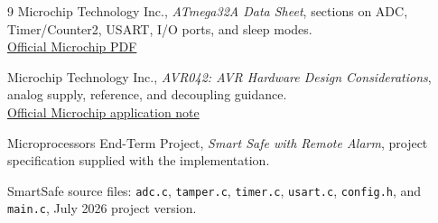 \documentclass[11pt,a4paper]{article}
\begin{document}
\begin{thebibliography}{9}
Microchip Technology Inc., \emph{ATmega32A Data Sheet}, sections on ADC, Timer/Counter2, USART, I/O ports, and sleep modes.\\
\href{https://ww1.microchip.com/downloads/en/DeviceDoc/Atmega32A-Data-Sheet-DS40002072A.pdf}{Official Microchip PDF}

Microchip Technology Inc., \emph{AVR042: AVR Hardware Design Considerations}, analog supply, reference, and decoupling guidance.\\
\href{https://ww1.microchip.com/downloads/en/AppNotes/Atmel-2521-AVR-Hardware-Design-Considerations_ApplicationNote_AVR042.pdf}{Official Microchip application note}

Microprocessors End-Term Project, \emph{Smart Safe with Remote Alarm}, project specification supplied with the implementation.

SmartSafe source files: \texttt{adc.c}, \texttt{tamper.c}, \texttt{timer.c}, \texttt{usart.c}, \texttt{config.h}, and \texttt{main.c}, July 2026 project version.
\end{thebibliography}
\end{document}
